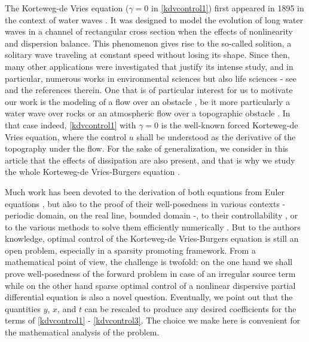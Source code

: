 The Korteweg-de Vries equation ($\gamma=0$ in \eqref{kdvcontrol1}) first appeared in 1895 in the context of water waves \cite{korteweg1895xli}. It was designed to model the evolution of long water waves in a channel of rectangular cross section when the effects of nonlinearity and dispersion balance. This phenomenon gives rise to the so-called solition, a solitary wave traveling at constant speed without losing its shape. Since then, many other applications were investigated that justify its intense study, and in particular, numerous works in environmental sciences but also life sciences - see \cite{dauxois2006physics,whitham2011linear,Crepeau2007594,yomosa1987} and the references therein. One that is of particular interest for us to motivate our work is the modeling of a flow over an obstacle \cite{milewski2004forced,shen1992forced,shen1996accuracy}, be it more particularly a water wave over rocks or an atmospheric flow over a topographic obstacle \cite{baines1997topographic}. In that case indeed, \eqref{kdvcontrol1} with $\gamma=0$ is the well-known forced Korteweg-de Vries equation, where the control $u$ shall be understood as the derivative of the topography under the flow. For the sake of generalization, we consider in this article that the effects of dissipation are also present, and that is why we study the whole Korteweg-de Vries-Burgers equation \cite{su2003korteweg}.

Much work has been devoted to the derivation of both equations from Euler equations \cite{shen1992forced,constantin2008,su2003korteweg}, but also to the proof of their well-posedness in various contexts \cite{miura1976korteweg,kenig1993,bourgain1997periodic} - periodic domain, on the real line, bounded domain -, to their controllability \cite{rosier1997exact,glass2008some,coron2003exact,chapouly2009global}, or to the various methods to solve them efficiently numerically \cite{trefethen2000spectral,shen2003new,ma2000legendre}. But to the authors knowledge, optimal control of the Korteweg-de Vries-Burgers equation is still an open problem, especially in a sparsity promoting framework. From a mathematical point of view, the challenge is twofold: on the one hand we shall prove well-posedness of the forward problem in case of an irregular source term while on the other hand sparse optimal control of a nonlinear dispersive partial differential equation is also a novel question. Eventually, we point out that the quantities $y$, $x$, and $t$ can be rescaled to produce any desired coefficients for the terms of \eqref{kdvcontrol1} - \eqref{kdvcontrol3}. The choice we make here is convenient for the mathematical analysis of the problem.

